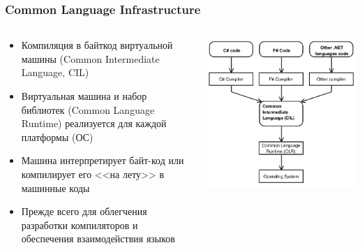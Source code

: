 \documentclass[xetex,mathserif,serif]{beamer}
\begin{document}
	\begin{frame}
		\frametitle{Common Language Infrastructure}
		\begin{columns}
			\begin{column}{0.5\textwidth}
				\begin{small}
					\begin{itemize}
						\item Компиляция в байткод виртуальной машины (Common Intermediate Language, CIL)
						\item Виртуальная машина и набор библиотек (Common Language Runtime) реализуется для каждой платформы (ОС)
						\item Машина интерпретирует байт-код или компилирует его <<на лету>> в машинные коды
						\item Прежде всего для облегчения разработки компиляторов и обеспечения взаимодействия языков
					\end{itemize}
				\end{small}
			\end{column}
			\begin{column}{0.5\textwidth}
				\begin{center}
					\includegraphics[width=\textwidth]{CLI.png}
				\end{center}
			\end{column}
		\end{columns}
	\end{frame}
\end{document}
